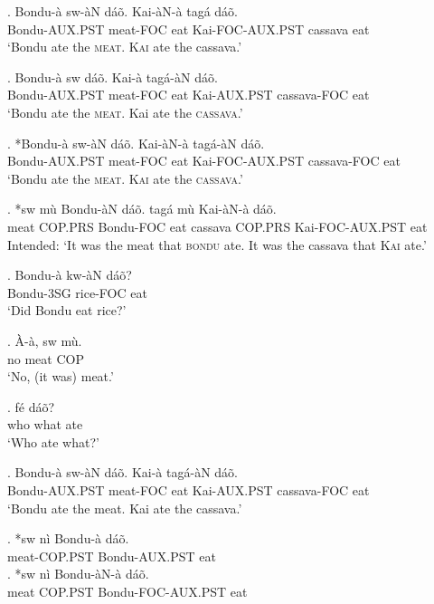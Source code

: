 \documentclass{assets/fieldnotes}
\begin{document}
\exg. Bondu-à sw-àN dáõ. Kai-àN-à tagá dáõ.\\
Bondu-AUX.PST meat-FOC eat Kai-FOC-AUX.PST cassava eat\\
`Bondu ate the \textsc{meat}. \textsc{Kai} ate the cassava.'

\exg. Bondu-à sw dáõ. Kai-à tagá-àN dáõ.\\
Bondu-AUX.PST meat-FOC eat Kai-AUX.PST cassava-FOC eat\\
`Bondu ate the \textsc{meat}. Kai ate the \textsc{cassava}.'

\exg. *Bondu-à sw-àN dáõ. Kai-àN-à tagá-àN dáõ.\\
Bondu-AUX.PST meat-FOC eat Kai-FOC-AUX.PST cassava-FOC eat\\
`Bondu ate the \textsc{meat}. \textsc{Kai} ate the \textsc{cassava}.'

\exg. *sw mù Bondu-àN dáõ. tagá mù Kai-àN-à dáõ.\\
meat COP.PRS Bondu-FOC eat cassava COP.PRS Kai-FOC-AUX.PST eat\\
Intended: `It was the meat that \textsc{bondu} ate. It was the cassava that \textsc{Kai} ate.'

\exg. Bondu-à kw-àN dáõ?\\
Bondu-3SG rice-FOC eat\\
`Did Bondu eat rice?'

\exg. À-à, sw mù.\\
no meat COP\\
`No, (it was) meat.'

\exg.  fé dáõ?\\
who what ate\\
`Who ate what?'

\exg. Bondu-à sw-àN dáõ. Kai-à tagá-àN dáõ.\\
Bondu-AUX.PST meat-FOC eat Kai-AUX.PST cassava-FOC eat\\
`Bondu ate the meat. Kai ate the cassava.'

\exg. *sw nì Bondu-à dáõ.\\
meat-COP.PST Bondu-AUX.PST eat\\

\exg. *sw nì Bondu-àN-à dáõ.\\
meat COP.PST Bondu-FOC-AUX.PST eat\\
\end{document}
